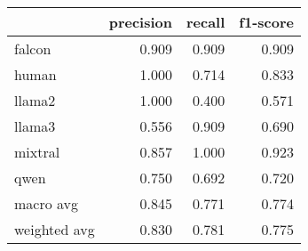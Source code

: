 \begin{tabular}{lrrr}
\toprule
 & precision & recall & f1-score \\
\midrule
falcon & 0.909 & 0.909 & 0.909 \\
human & 1.000 & 0.714 & 0.833 \\
llama2 & 1.000 & 0.400 & 0.571 \\
llama3 & 0.556 & 0.909 & 0.690 \\
mixtral & 0.857 & 1.000 & 0.923 \\
qwen & 0.750 & 0.692 & 0.720 \\
macro avg & 0.845 & 0.771 & 0.774 \\
weighted avg & 0.830 & 0.781 & 0.775 \\
\bottomrule
\end{tabular}

